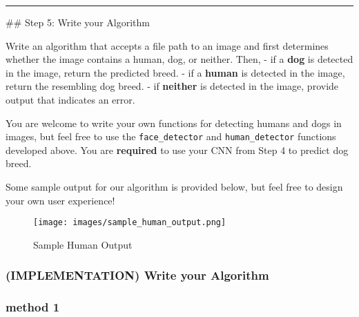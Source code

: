 \documentclass[11pt]{article}
\makeatletter
\def\maxwidth{\ifdim\Gin@nat@width>\linewidth\linewidth
    \else\Gin@nat@width\fi}
\let\Oldincludegraphics\includegraphics
\renewcommand{\includegraphics}[1]{\Oldincludegraphics[width=.8\maxwidth]{#1}}
\makeatother
\begin{document}
    \begin{center}\rule{0.5\linewidth}{\linethickness}\end{center}

 \#\# Step 5: Write your Algorithm

Write an algorithm that accepts a file path to an image and first
determines whether the image contains a human, dog, or neither. Then, -
if a \textbf{dog} is detected in the image, return the predicted breed.
- if a \textbf{human} is detected in the image, return the resembling
dog breed. - if \textbf{neither} is detected in the image, provide
output that indicates an error.

You are welcome to write your own functions for detecting humans and
dogs in images, but feel free to use the \texttt{face\_detector} and
\texttt{human\_detector} functions developed above. You are
\textbf{required} to use your CNN from Step 4 to predict dog breed.

Some sample output for our algorithm is provided below, but feel free to
design your own user experience!

\begin{figure}
\centering
\texttt{[image: images/sample\_human\_output.png]}
\caption{Sample Human Output}
\end{figure}

\hypertarget{implementation-write-your-algorithm}{%
\subsubsection{(IMPLEMENTATION) Write your
Algorithm}\label{implementation-write-your-algorithm}}

    \hypertarget{method-1}{%
\subsubsection{method 1}\label{method-1}}
\end{document}
